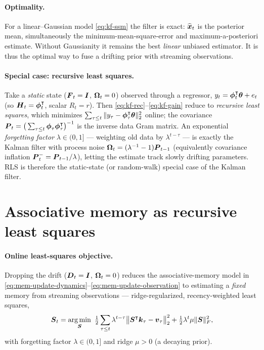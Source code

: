 \documentclass{article} %
\begin{document}
\paragraph{Optimality.}
For a linear--Gaussian model \eqref{eq:kf-ssm} the filter is exact: $\widehat{\boldsymbol{x}}_t$ is the
posterior mean, simultaneously the minimum-mean-square-error and maximum-a-posteriori
estimate. Without Gaussianity it remains the best \emph{linear} unbiased estimator. It
is thus the optimal way to fuse a drifting prior with streaming observations.

\paragraph{Special case: recursive least squares.}
Take a \emph{static} state ($\boldsymbol{F}_t=\boldsymbol{I}$, $\boldsymbol{\Omega}_t=0$) observed through a regressor,
$y_t=\boldsymbol{\phi}_t^{\intercal}\boldsymbol{\theta}+e_t$ (so $\boldsymbol{H}_t=\boldsymbol{\phi}_t^{\intercal}$, scalar $R_t=r$). Then
\eqref{eq:kf-rec}--\eqref{eq:kf-gain} reduce to \emph{recursive least squares}, which
minimizes $\sum_{\tau\le t}\|y_\tau-\boldsymbol{\phi}_\tau^{\intercal}\boldsymbol{\theta}\|_2^2$ online; the covariance
$\boldsymbol{P}_t=\big(\sum_{\tau\le t}\boldsymbol{\phi}_\tau\boldsymbol{\phi}_\tau^{\intercal}\big)^{-1}$ is the inverse data Gram
matrix. An exponential \emph{forgetting factor} $\lambda\in(0,1]$ --- weighting old
data by $\lambda^{t-\tau}$ --- is exactly the Kalman filter with process noise
$\boldsymbol{\Omega}_t=(\lambda^{-1}-1)\boldsymbol{P}_{t-1}$ (equivalently covariance inflation $\boldsymbol{P}_t^-=\boldsymbol{P}_{t-1}/\lambda$),
letting the estimate track slowly drifting parameters. RLS is therefore the
static-state (or random-walk) special case of the Kalman filter.

\section{Associative memory as recursive least squares}
\label{app:mem-rls}

\paragraph{Online least-squares objective.}
Dropping the drift ($\boldsymbol{D}_t=\boldsymbol{I}$, $\boldsymbol{\Omega}_t=0$) reduces the associative-memory model
in \eqref{eq:mem-update-dynamics}--\eqref{eq:mem-update-observation} to estimating
a \emph{fixed} memory from streaming observations --- ridge-regularized, recency-weighted
least squares,
\begin{equation}
  \ve{S}_t = \argmin_{\ve{S}}\ \tfrac12\sum_{\tau\le t}\lambda^{t-\tau}
  \big\|\ve{S}^{\tr}\ve{k}_\tau-\ve{v}_\tau\big\|_2^2
        + \tfrac12\lambda^{t}\mu\|\ve{S}\|_F^2 ,
  \label{eq:rls-obj}
\end{equation}
with forgetting factor $\lambda\in(0,1]$ and ridge $\mu>0$ (a decaying prior).
\end{document}
